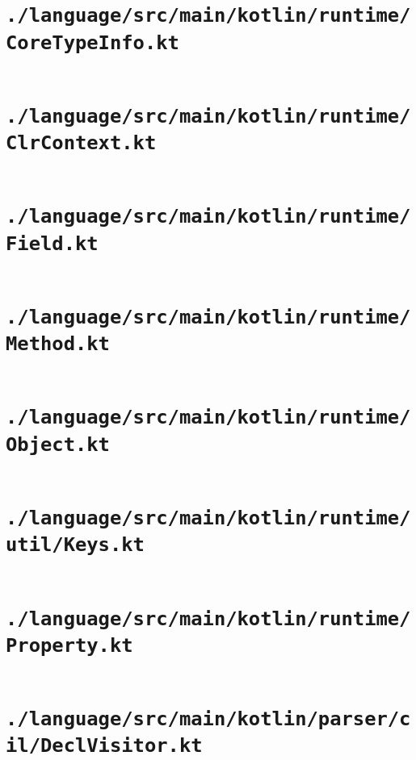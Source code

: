 \documentclass[a4paper, 11pt]{report}
\begin{document}
    \section{\lstinline{./language/src/main/kotlin/runtime/CoreTypeInfo.kt}}
    \inputminted{kotlin}{./language/src/main/kotlin/runtime/CoreTypeInfo.kt}


    \section{\lstinline{./language/src/main/kotlin/runtime/ClrContext.kt}}
    \inputminted{kotlin}{./language/src/main/kotlin/runtime/ClrContext.kt}


    \section{\lstinline{./language/src/main/kotlin/runtime/Field.kt}}
    \inputminted{kotlin}{./language/src/main/kotlin/runtime/Field.kt}


    \section{\lstinline{./language/src/main/kotlin/runtime/Method.kt}}
    \inputminted{kotlin}{./language/src/main/kotlin/runtime/Method.kt}


    \section{\lstinline{./language/src/main/kotlin/runtime/Object.kt}}
    \inputminted{kotlin}{./language/src/main/kotlin/runtime/Object.kt}


    \section{\lstinline{./language/src/main/kotlin/runtime/util/Keys.kt}}
    \inputminted{kotlin}{./language/src/main/kotlin/runtime/util/Keys.kt}


    \section{\lstinline{./language/src/main/kotlin/runtime/Property.kt}}
    \inputminted{kotlin}{./language/src/main/kotlin/runtime/Property.kt}


    \section{\lstinline{./language/src/main/kotlin/parser/cil/DeclVisitor.kt}}
    \inputminted{kotlin}{./language/src/main/kotlin/parser/cil/DeclVisitor.kt}
\end{document}
